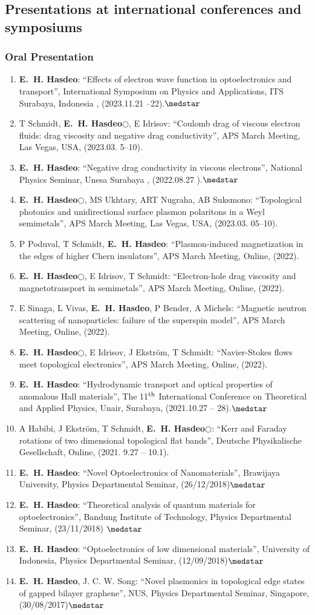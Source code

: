 \documentclass[a4paper,11pt]{article}
\newcommand{\jjm}[5]{\item {#1}: {``#2''}, {#3}, {#5}, (#4).}
\def\hes{{\bf E.~H. Hasdeo}}
\begin{document}
\subsection{Presentations at international conferences and symposiums}
\subsubsection*{Oral Presentation}
\begin{enumerate}
  \jjm{\hes} {Effects of electron wave function in optoelectronics and
    transport} {International Symposium on Physics and Applications}
      {2023.11.21 --22}{ITS Surabaya, Indonesia }$\medstar$
\jjm{ T
        Schmidt, \hes $\bigcirc$, E Idrisov} {Coulomb drag of viscous
        electron fluids: drag viscosity and negative drag
        conductivity} {APS March Meeting} {2023.03. 5--10}{ Las Vegas,
        USA}
\jjm{\hes}{Negative drag conductivity in viscous electrons}{National Physics Seminar}{2022.08.27 }{Unesa Surabaya }$\medstar$

\jjm {\hes $\bigcirc$, MS Ukhtary, ART Nugraha, AB Suksmono}
     {Topological photonics and unidirectional surface plasmon polaritons in a Weyl semimetals}{APS March Meeting}
     {2023.03. 05--10}{ Las Vegas, USA}
     \jjm {P Poduval, T Schmidt, \hes}
          {Plasmon-induced magnetization in the edges of higher Chern insulators}{APS March Meeting}
          {2022}{Online}
          \jjm{\hes $\bigcirc$, E Idrisov, T Schmidt}
              {Electron-hole drag viscosity and magnetotransport in semimetals}
              {APS March Meeting}
              {2022}
              {Online}
              \jjm{E Sinaga, L Vivas, \hes, P Bender, A Michels}
                  {Magnetic neutron scattering of nanoparticles: failure of the superspin model}{APS March Meeting}
              {2022}
              {Online}
              \jjm{\hes$\bigcirc$, E Idrisov, J Ekstr{\"o}m, T Schmidt}{Navier-Stokes flows meet topological electronics}{APS March Meeting}
              {2022}
              {Online}
\jjm{\hes}
{Hydrodynamic transport and optical properties of anomalous Hall materials}
{The 11$^{\rm th}$ International Conference on Theoretical and Applied Physics}
{2021.10.27 -- 28}
{Unair, Surabaya}$\medstar$

\jjm{A Habibi, J Ekstr{\"o}m, T Schmidt, \hes $\bigcirc$}{Kerr and Faraday rotations of two dimensional topological flat bands}{Deutsche Physikalische Gesellschaft}{2021. 9.27 -- 10.1}{Online}
  \item \hes: ``Novel Optoelectronics of Nanomaterials'', Brawijaya University, Physics Departmental Seminar, (26/12/2018)$\medstar$
  \item \hes: ``Theoretical analysis of quantum materials for optoelectronics'', Bandung Institute of Technology, Physics Departmental Seminar, (23/11/2018) $\medstar$
  \item \hes: ``Optoelectronics of low dimensional materials'', University of Indonesia, Physics Departmental Seminar, (12/09/2018)$\medstar$
  \item \hes, J. C. W. Song: “Novel plasmonics in topological edge states of gapped bilayer graphene”, NUS, Physics Departmental Seminar, Singapore, (30/08/2017)$\medstar$


\end{enumerate}
\end{document}
